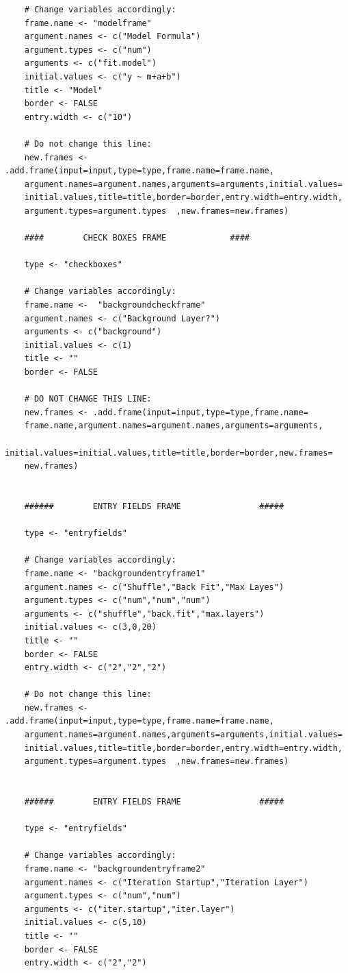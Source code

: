\documentclass[a4paper]{article}\usepackage[]{graphicx}\usepackage[]{color}
\begin{document}
\begin{verbatim}
	# Change variables accordingly:
	frame.name <- "modelframe"  
	argument.names <- c("Model Formula") 
	argument.types <- c("num")
	arguments <- c("fit.model")
	initial.values <- c("y ~ m+a+b")
	title <- "Model"
	border <- FALSE
	entry.width <- c("10")  
	
	# Do not change this line:
	new.frames <- .add.frame(input=input,type=type,frame.name=frame.name,
    argument.names=argument.names,arguments=arguments,initial.values=
    initial.values,title=title,border=border,entry.width=entry.width,
    argument.types=argument.types  ,new.frames=new.frames)
	
	####		CHECK BOXES FRAME 			  ####
	
	type <- "checkboxes"
	
	# Change variables accordingly:
	frame.name <-  "backgroundcheckframe"
	argument.names <- c("Background Layer?") 
	arguments <- c("background") 
	initial.values <- c(1) 
	title <- ""
	border <- FALSE
	
	# DO NOT CHANGE THIS LINE:
	new.frames <- .add.frame(input=input,type=type,frame.name=
    frame.name,argument.names=argument.names,arguments=arguments,
    initial.values=initial.values,title=title,border=border,new.frames=
    new.frames)
	
	
	######		  ENTRY FIELDS FRAME 				#####
	
	type <- "entryfields"
	
	# Change variables accordingly:
	frame.name <- "backgroundentryframe1"  
	argument.names <- c("Shuffle","Back Fit","Max Layes") 
	argument.types <- c("num","num","num")
	arguments <- c("shuffle","back.fit","max.layers")
	initial.values <- c(3,0,20)
	title <- ""
	border <- FALSE
	entry.width <- c("2","2","2")  
	
	# Do not change this line:
	new.frames <- .add.frame(input=input,type=type,frame.name=frame.name,
    argument.names=argument.names,arguments=arguments,initial.values=
    initial.values,title=title,border=border,entry.width=entry.width,
    argument.types=argument.types  ,new.frames=new.frames)
	
	
	######		  ENTRY FIELDS FRAME 				#####
	
	type <- "entryfields"
	
	# Change variables accordingly:
	frame.name <- "backgroundentryframe2"  
	argument.names <- c("Iteration Startup","Iteration Layer") 
	argument.types <- c("num","num")
	arguments <- c("iter.startup","iter.layer")
	initial.values <- c(5,10)
	title <- ""
	border <- FALSE
	entry.width <- c("2","2")  
	

\end{verbatim}
\end{document}
